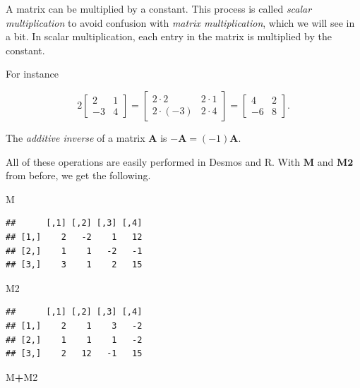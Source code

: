 \documentclass[
]{book}
\newenvironment{Shaded}{\begin{snugshade}}{\end{snugshade}}
\newcommand{\NormalTok}[1]{#1}
\newcommand{\SpecialCharTok}[1]{\textcolor[rgb]{0.81,0.36,0.00}{\textbf{#1}}}
\theoremstyle{definition}
\theoremstyle{definition}
\theoremstyle{definition}
\theoremstyle{definition}
\theoremstyle{remark}
\begin{document}
A matrix can be multiplied by a constant. This process is called \emph{scalar multiplication} to avoid confusion with \emph{matrix multiplication}, which we will see in a bit. In scalar multiplication, each entry in the matrix is multiplied by the constant.

For instance

\[2\begin{bmatrix}
2 & 1\\-3 & 4
\end{bmatrix}=
\begin{bmatrix}
2\cdot 2 & 2\cdot 1\\ 2\cdot (-3) & 2\cdot 4
\end{bmatrix}=
\begin{bmatrix}
4 & 2\\-6 & 8
\end{bmatrix}.\]

The \emph{additive inverse} of a matrix \(\mathbf{A}\) is
\(-\mathbf{A}=(-1)\mathbf{A}\).

All of these operations are easily performed in Desmos and R. With \(\mathbf{M}\) and \(\mathbf{M2}\) from before, we get the following.

\begin{Shaded}
\begin{Highlighting}[]
\NormalTok{M}
\end{Highlighting}
\end{Shaded}

\begin{verbatim}
##      [,1] [,2] [,3] [,4]
## [1,]    2   -2    1   12
## [2,]    1    1   -2   -1
## [3,]    3    1    2   15
\end{verbatim}

\begin{Shaded}
\begin{Highlighting}[]
\NormalTok{M2}
\end{Highlighting}
\end{Shaded}

\begin{verbatim}
##      [,1] [,2] [,3] [,4]
## [1,]    2    1    3   -2
## [2,]    1    1    1   -2
## [3,]    2   12   -1   15
\end{verbatim}

\begin{Shaded}
\begin{Highlighting}[]
\NormalTok{M}\SpecialCharTok{+}\NormalTok{M2}
\end{Highlighting}
\end{Shaded}
\end{document}
